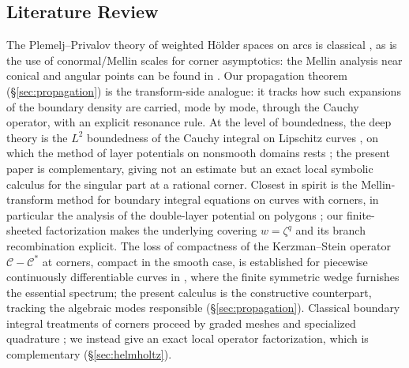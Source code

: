 \documentclass[pdflatex,sn-mathphys-num]{sn-jnl}%
\newcommand{\Cau}{\mathcal{C}}
\theoremstyle{thmstyleone}
\theoremstyle{thmstyletwo}
\theoremstyle{thmstylethree}
\begin{document}
\subsection{Literature Review}
The Plemelj--Privalov theory of weighted H\"older spaces on arcs is classical
\cite{reyes2003one,muskhelishvili2008singular,gakhov2014boundary,wang2025analysis,wang2025analysis1,pritsker2008find,abreu2012plemelj,yu2026from,abreu2007notion,liu2025bidirectional}, as is the use of conormal/Mellin scales for corner
asymptotics: the Mellin analysis near conical and angular
points can be found in \cite{schrohe2023introduction,liang2025global,schulze2022mellin,anjam2020geometric,maday2019regularity,wang2026algebraic}.
Our propagation theorem (\S\ref{sec:propagation}) is the transform-side
analogue: it tracks how such expansions of the boundary density are carried,
mode by mode, through the Cauchy operator, with an explicit resonance rule. At
the level of boundedness, the deep theory is the $L^{2}$ boundedness of the
Cauchy integral on Lipschitz curves
\cite{david1984boundedness,gao2022rolling,rochberg1984calderon,calderon1977cauchy,wang2026damage,mcintosh2006convolution,wang2025multi,coifman1982integrale,coifman1989two,yu2026pattern,qian2019singular,jones2006square}, on which the method of
layer potentials on nonsmooth domains rests \cite{cai2026optimal,verchota1984layer,costabel1988boundary,mitrea1997method,wang2026breakdown,mitrea2013multi,fabes1977double};
the present paper is complementary, giving not an estimate but an exact local
symbolic calculus for the singular part at a rational corner. Closest in spirit
is the Mellin-transform method for boundary integral equations on curves with
corners, in particular the analysis of the double-layer potential on polygons
\cite{costabel1983normal,yu2026beyond,maz1991boundary,qiao2012single,yu2026rigorous,qiao2018double}; our finite-sheeted factorization makes the
underlying covering $w=\zeta^{q}$ and its branch recombination explicit. The
loss of compactness of the Kerzman--Stein operator $\Cau-\Cau^{*}$ at corners, compact
in the smooth case, is established for piecewise
continuously differentiable curves in \cite{bolt2015kerzman}, where the finite
symmetric wedge furnishes the essential spectrum; the present calculus is the
constructive counterpart, tracking the algebraic modes responsible
(\S\ref{sec:propagation}). Classical boundary integral treatments of corners
proceed by graded meshes and specialized quadrature \cite{kress1989linear,kress1991boundary}; we
instead give an exact local operator factorization, which is complementary
(\S\ref{sec:helmholtz}).
\end{document}
